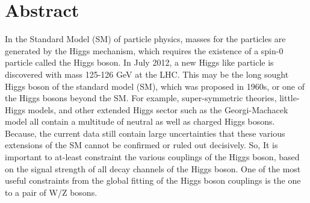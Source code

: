 \chapter*{Abstract}
In the Standard Model (SM) of particle physics, masses for the particles are generated by the Higgs mechanism, which requires the existence of a spin-0 particle called the Higgs boson. In July 2012, a new Higgs like particle is discovered with mass 125-126 GeV at the LHC. This may be the long sought Higgs boson of the standard model (SM), which was proposed in 1960s, or one of the Higgs bosons beyond the SM. For example, super-symmetric theories, little-Higgs models, and other extended Higgs sector such as the Georgi-Machacek model all contain a multitude of neutral as well as charged Higgs bosons. Because, the current data still contain large uncertainties that these various extensions of the SM cannot be confirmed or ruled out decisively. So, It is important to at-least constraint the various couplings of the Higgs boson, based on the signal strength of all decay channels of the Higgs boson. One of the most useful constraints from the global fitting of the Higgs boson couplings is the one to a pair of W/Z bosons.



